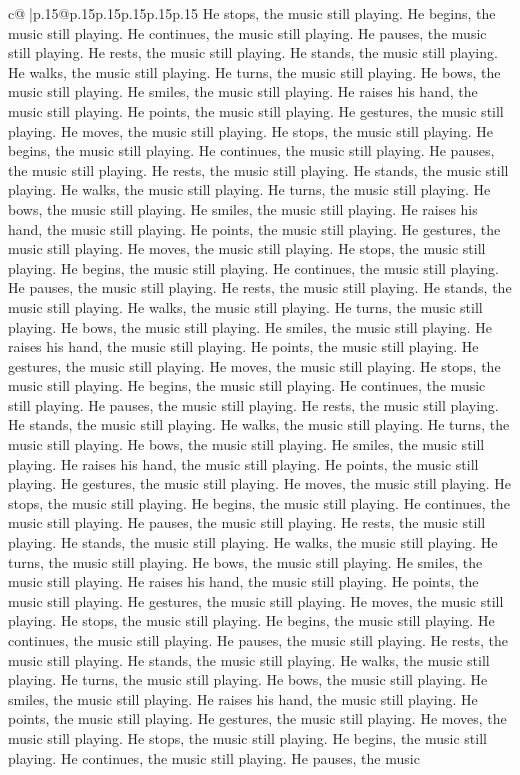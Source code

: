 \documentclass{article}
\begin{document}
{\begin{supertabular}{c@{$\;$}|p{.15\linewidth}@{}p{.15\linewidth}p{.15\linewidth}p{.15\linewidth}p{.15\linewidth}p{.15\linewidth}}
{{{He stops, the music still playing. He begins, the music still playing. He continues, the music still playing. He pauses, the music still playing. He rests, the music still playing. He stands, the music still playing. He walks, the music still playing. He turns, the music still playing. He bows, the music still playing. He smiles, the music still playing. He raises his hand, the music still playing. He points, the music still playing. He gestures, the music still playing. He moves, the music still playing. He stops, the music still playing. He begins, the music still playing. He continues, the music still playing. He pauses, the music still playing. He rests, the music still playing. He stands, the music still playing. He walks, the music still playing. He turns, the music still playing. He bows, the music still playing. He smiles, the music still playing. He raises his hand, the music still playing. He points, the music still playing. He gestures, the music still playing. He moves, the music still playing. He stops, the music still playing. He begins, the music still playing. He continues, the music still playing. He pauses, the music still playing. He rests, the music still playing. He stands, the music still playing. He walks, the music still playing. He turns, the music still playing. He bows, the music still playing. He smiles, the music still playing. He raises his hand, the music still playing. He points, the music still playing. He gestures, the music still playing. He moves, the music still playing. He stops, the music still playing. He begins, the music still playing. He continues, the music still playing. He pauses, the music still playing. He rests, the music still playing. He stands, the music still playing. He walks, the music still playing. He turns, the music still playing. He bows, the music still playing. He smiles, the music still playing. He raises his hand, the music still playing. He points, the music still playing. He gestures, the music still playing. He moves, the music still playing. He stops, the music still playing. He begins, the music still playing. He continues, the music still playing. He pauses, the music still playing. He rests, the music still playing. He stands, the music still playing. He walks, the music still playing. He turns, the music still playing. He bows, the music still playing. He smiles, the music still playing. He raises his hand, the music still playing. He points, the music still playing. He gestures, the music still playing. He moves, the music still playing. He stops, the music still playing. He begins, the music still playing. He continues, the music still playing. He pauses, the music still playing. He rests, the music still playing. He stands, the music still playing. He walks, the music still playing. He turns, the music still playing. He bows, the music still playing. He smiles, the music still playing. He raises his hand, the music still playing. He points, the music still playing. He gestures, the music still playing. He moves, the music still playing. He stops, the music still playing. He begins, the music still playing. He continues, the music still playing. He pauses, the music }}}
\end{supertabular}}
\end{document}
